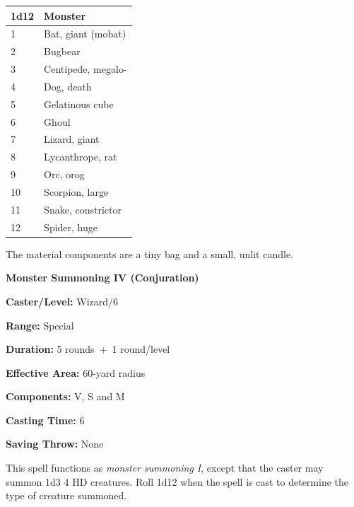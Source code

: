 \begin{multicols}{2}
\noindent
\begin{tabular}{|p{}|p{}|}
\hline
1d12	& Monster \\
\hline\hline
\rowcolor[gray]{.9}1	& Bat, giant (mobat) \\
2	& Bugbear \\
\rowcolor[gray]{.9}3	& Centipede, megalo- \\
4	& Dog, death \\
\rowcolor[gray]{.9}5	& Gelatinous cube \\
6	& Ghoul \\
\rowcolor[gray]{.9}7	& Lizard, giant \\
8	& Lycanthrope, rat \\
\rowcolor[gray]{.9}9	& Orc, orog \\
10	& Scorpion, large \\
\rowcolor[gray]{.9}11	& Snake, constrictor \\
12	& Spider, huge \\
\hline
\end{tabular}

The material components are a tiny bag and a small, unlit candle.

\vspace{1em}

\noindent
\begin{minipage}{\columnwidth}

\noindent \textbf{Monster Summoning IV (Conjuration)}

\noindent \textbf{Caster/Level:} Wizard/6

\noindent \textbf{Range:} Special

\noindent \textbf{Duration:} 5 rounds~+~1 round/level

\noindent \textbf{Effective Area:} 60-yard radius

\noindent \textbf{Components:} V, S and M

\noindent \textbf{Casting Time:} 6

\noindent \textbf{Saving Throw:} None

\end{minipage}

This spell functions as \textit{monster summoning I}, except that the caster may summon 1d3 4 HD creatures.  Roll 1d12 when the spell is cast to determine the type of creature summoned.


\end{multicols}
